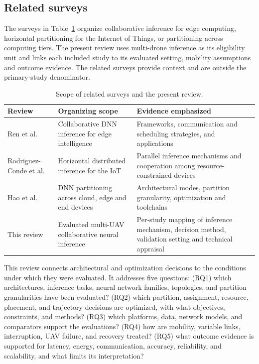 \documentclass[pdflatex,sn-vancouver-num]{sn-jnl}
\begin{document}
\subsection{Related surveys}
The surveys in Table~\ref{tab:related} organize collaborative inference for edge computing, horizontal partitioning for the Internet of Things, or partitioning across computing tiers. The present review uses multi-drone inference as its eligibility unit and links each included study to its evaluated setting, mobility assumptions and outcome evidence. The related surveys provide context and are outside the primary-study denominator.

\begin{table}[tb]
\caption{Scope of related surveys and the present review.}\label{tab:related}
\centering\small
\begin{tabular}{@{}>{\raggedright\arraybackslash}p{.23\linewidth}>{\raggedright\arraybackslash}p{.33\linewidth}>{\raggedright\arraybackslash}p{.35\linewidth}@{}}
\toprule
Review & Organizing scope & Evidence emphasized \\
\midrule
Ren et al.~\cite{ren2023survey} & Collaborative DNN inference for edge intelligence & Frameworks, communication and scheduling strategies, and applications \\
Rodriguez-Conde et al.~\cite{rodriguez2023survey} & Horizontal distributed inference for the IoT & Parallel inference mechanisms and cooperation among resource-constrained devices \\
Hao et al.~\cite{hao2026survey} & DNN partitioning across cloud, edge and end devices & Architectural modes, partition granularity, optimization and toolchains \\
This review & Evaluated multi-UAV collaborative neural inference & Per-study mapping of inference mechanism, decision method, validation setting and technical appraisal \\
\bottomrule
\end{tabular}
\end{table}

This review connects architectural and optimization decisions to the conditions under which they were evaluated. It addresses five questions: (RQ1) which architectures, inference tasks, neural network families, topologies, and partition granularities have been evaluated? (RQ2) which partition, assignment, resource, placement, and trajectory decisions are optimized, with what objectives, constraints, and methods? (RQ3) which platforms, data, network models, and comparators support the evaluations? (RQ4) how are mobility, variable links, interruption, UAV failure, and recovery treated? (RQ5) what outcome evidence is supported for latency, energy, communication, accuracy, reliability, and scalability, and what limits its interpretation?
\end{document}
